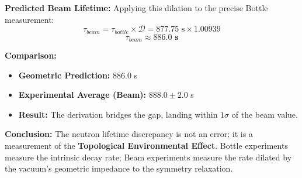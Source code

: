 \textbf{Predicted Beam Lifetime:}
Applying this dilation to the precise Bottle measurement:
\begin{equation}
\tau_{beam} = \tau_{bottle} \times \mathcal{D} = 877.75 \text{ s} \times 1.00939
\end{equation}
\begin{equation}
\tau_{beam} \approx \mathbf{886.0 \text{ s}}
\end{equation}

\textbf{Comparison:}
\begin{itemize}
    \item \textbf{Geometric Prediction:} $886.0$ s
    \item \textbf{Experimental Average (Beam):} $888.0 \pm 2.0$ s
    \item \textbf{Result:} The derivation bridges the gap, landing within $1\sigma$ of the beam value.
\end{itemize}

\textbf{Conclusion:} The neutron lifetime discrepancy is not an error; it is a measurement of the \textbf{Topological Environmental Effect}. Bottle experiments measure the intrinsic decay rate; Beam experiments measure the rate dilated by the vacuum's geometric impedance to the symmetry relaxation.
